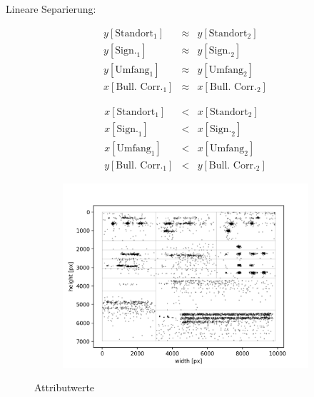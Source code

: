 Lineare Separierung:

\begin{minipage}{0.45\textwidth}
\begin{center}
\begin{eqnarray*}
y[\text{Standort}_1] &\approx & y[\text{Standort}_2]\\
y[\text{Sign.}_1] &\approx & y[\text{Sign.}_2]\\
y[\text{Umfang}_1] &\approx & y[\text{Umfang}_2]\\
x[\text{Bull. Corr.}_1] &\approx & x[\text{Bull. Corr.}_2]
\end{eqnarray*}
\end{center}
\end{minipage}
\begin{minipage}{0.45\textwidth}
\begin{eqnarray*}
x[\text{Standort}_1] &<& x[\text{Standort}_2]\\
x[\text{Sign.}_1] &<& x[\text{Sign.}_2]\\
x[\text{Umfang}_1] &<& x[\text{Umfang}_2]\\
y[\text{Bull. Corr.}_1] &< & y[\text{Bull. Corr.}_2]
\end{eqnarray*}
\end{minipage}



\begin{figure}[H]
\centering
	\begin{subfigure}[t]{0.47\textwidth}
	\begin{flushright}
		\includegraphics[scale=0.5]{Bilder/ocr_attributes_3.png}
	\end{flushright}
	\end{subfigure}
	\begin{subfigure}[t]{0.47\textwidth}
	\begin{flushleft}

	\end{flushleft}
	\end{subfigure}
\caption{Attributwerte} 
\end{figure}




